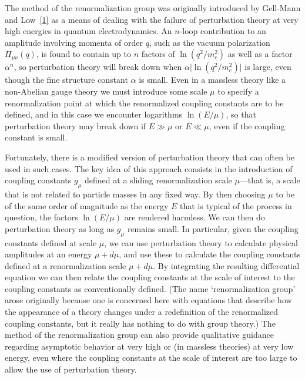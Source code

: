 
The method of the renormalization group was originally introduced by
Gell-Mann and Low~\hyperref[ch18-ref-1]{[1]} as a means of dealing with the
failure of perturbation theory at very high energies in quantum
electrodynamics. An $n$-loop contribution to an amplitude involving momenta
of order $q$, such as the vacuum polarization $\Pi_{\mu\nu}(q)$, is found to
contain up to $n$ factors of $\ln(q^2/m_e^2)$ as well as a factor $\alpha^n$,
so perturbation theory will break down when
$\alpha\lvert\ln(q^2/m_e^2)\rvert$ is large, even though the fine structure
constant $\alpha$ is small. Even in a massless theory like a non-Abelian
gauge theory we must introduce some scale $\mu$ to specify a renormalization
point at which the renormalized coupling constants are to be defined, and in
this case we encounter logarithms $\ln(E/\mu)$, so that perturbation theory
may break down if $E\gg\mu$ or $E\ll\mu$, even if the coupling constant is
small.

Fortunately, there is a modified version of perturbation theory that can
often be used in such cases. The key idea of this approach consists in the
introduction of coupling constants $g_\mu$ defined at a sliding
renormalization scale $\mu$---that is, a scale that is not related to particle
masses in any fixed way. By then choosing $\mu$ to be of the same order of
magnitude as the energy $E$ that is typical of the process in question, the
factors $\ln(E/\mu)$ are rendered harmless. We can then do perturbation theory
as long as $g_\mu$ remains small. In particular, given the coupling constants
defined at scale $\mu$, we can use perturbation theory to calculate physical
amplitudes at an energy $\mu+d\mu$, and use these to calculate the coupling
constants defined at a renormalization scale $\mu+d\mu$. By integrating the
resulting differential equation we can then relate the coupling constants at
the scale of interest to the coupling constants as conventionally defined.
(The name `renormalization group' arose originally because one is concerned
here with equations that describe how the appearance of a theory changes
under a redefinition of the renormalized coupling constants, but it really
has nothing to do with group theory.) The method of the renormalization group
can also provide qualitative guidance regarding asymptotic behavior at very
high or (in massless theories) at very low energy, even where the coupling
constants at the scale of interest are too large to allow the use of
perturbation theory.

